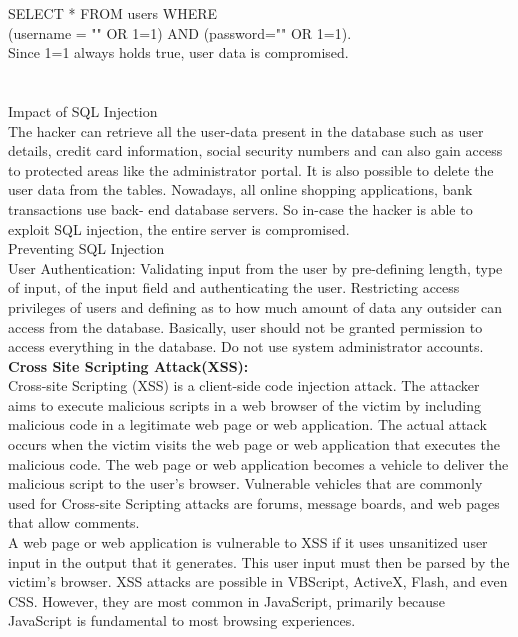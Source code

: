 \documentclass[a4paper, 12pt, fleqn]{article}
\begin{document}
\noindent
SELECT * FROM users WHERE \\
(username = "" OR 1=1) AND (password="" OR 1=1). \\
Since 1=1 always holds true, user data is compromised.

\newpage
\section*{}

\noindent
Impact of SQL Injection \\
The hacker can retrieve all the user-data present in the database such as
user details, credit card information, social security numbers and can also
gain access to protected areas like the administrator portal. It is also
possible to delete the user data from the tables.
Nowadays, all online shopping applications, bank transactions use back-
end database servers. So in-case the hacker is able to exploit SQL
injection, the entire server is compromised. \\

\noindent
Preventing SQL Injection \\
User Authentication: Validating input from the user by pre-defining length,
type of input, of the input field and authenticating the user.
Restricting access privileges of users and defining as to how much amount
of data any outsider can access from the database. Basically, user should
not be granted permission to access everything in the database.
Do not use system administrator accounts. \\

\noindent
\textbf{Cross Site Scripting Attack(XSS):} \\
Cross-site Scripting (XSS) is a client-side code injection attack. The
attacker aims to execute malicious scripts in a web browser of the victim
by including malicious code in a legitimate web page or web application.
The actual attack occurs when the victim visits the web page or web
application that executes the malicious code. The web page or web
application becomes a vehicle to deliver the malicious script to the user’s
browser. Vulnerable vehicles that are commonly used for Cross-site
Scripting attacks are forums, message boards, and web pages that allow
comments. \\

\noindent
A web page or web application is vulnerable to XSS if it uses unsanitized
user input in the output that it generates. This user input must then be
parsed by the victim’s browser. XSS attacks are possible in VBScript,
ActiveX, Flash, and even CSS. However, they are most common in
JavaScript, primarily because JavaScript is fundamental to most browsing
experiences. \\
\end{document}
